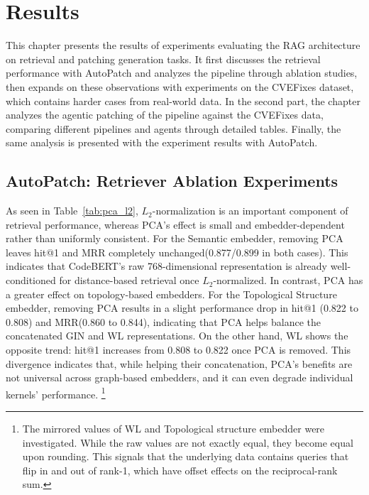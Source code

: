 \chapter{Results}\label{chapter:results}

This chapter presents the results of experiments evaluating the RAG architecture on retrieval and patching generation tasks. It first discusses the retrieval performance with AutoPatch and analyzes the pipeline through ablation studies, then expands on these observations with experiments on the CVEFixes dataset, which contains harder cases from real-world data. In the second part, the chapter analyzes the agentic patching of the pipeline against the CVEFixes data, comparing different pipelines and agents through detailed tables. Finally, the same analysis is presented with the experiment results with AutoPatch.   


\section{AutoPatch: Retriever Ablation Experiments}\label{sec:autopatch_retrieval}

As seen in Table~\ref{tab:pca_l2}, $L_2$-normalization is an important component of retrieval performance, whereas PCA's effect is small and embedder-dependent rather than uniformly consistent.
For the Semantic embedder, removing PCA leaves hit@1 and MRR completely unchanged(0.877/0.899 in both cases). 
This indicates that CodeBERT's raw 768-dimensional representation is already well-conditioned for distance-based retrieval once $L_2$-normalized. 
In contrast, PCA has a greater effect on topology-based embedders. For the Topological Structure embedder, removing PCA results in a slight performance drop in hit@1 (0.822 to 0.808) and MRR(0.860 to 0.844), indicating that PCA helps balance the concatenated GIN and WL representations. On the other hand, WL shows the opposite trend: hit@1 increases from 0.808 to 0.822 once PCA is removed. This divergence indicates that, while helping their concatenation, PCA's benefits are not universal across graph-based embedders, and it can even degrade individual kernels' performance. \footnote{The mirrored values of WL and Topological structure embedder were investigated. While the raw values are not exactly equal, they become equal upon rounding. This signals that the underlying data contains queries that flip in and out of rank-1, which have offset effects on the reciprocal-rank sum.}


